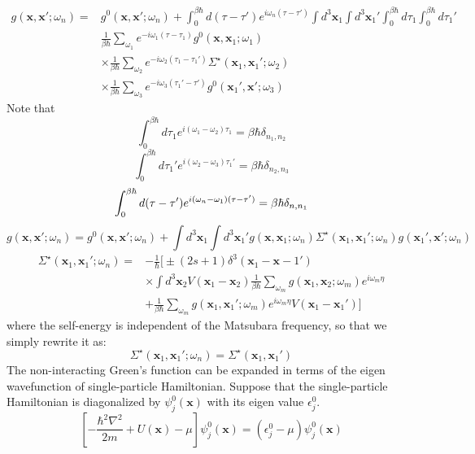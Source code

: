 \[
\begin{aligned}
g(\mathbf{x},\mathbf{x}';\omega_n)=&g^0(\mathbf{x},\mathbf{x}';\omega_n)+\int_0^{\beta\hbar} d(\tau-\tau') e^{i\omega_n(\tau-\tau')} \int d^3\mathbf{x}_1 \int d^3\mathbf{x}_1' \int_0^{\beta\hbar} d\tau_1 \int_0^{\beta\hbar} d\tau_1'\\
&\frac{1}{\beta\hbar}\sum_{\omega_1} e^{-i\omega_1(\tau-\tau_1)} g^0(\mathbf{x},\mathbf{x}_1;\omega_1)\\
&\times\frac{1}{\beta\hbar}\sum_{\omega_2} e^{-i\omega_2(\tau_1-\tau_1')} \Sigma^\star(\mathbf{x}_1,\mathbf{x}_1';\omega_2)\\
&\times\frac{1}{\beta\hbar}\sum_{\omega_3} e^{-i\omega_3(\tau_1'-\tau')} g^0(\mathbf{x}_1',\mathbf{x}';\omega_3)
\end{aligned}
\]
Note that
\[
\int_0^{\beta\hbar} d\tau_1 e^{i(\omega_1-\omega_2)\tau_1}=\beta\hbar\delta_{n_1,n_2}
\]
\[
\int_0^{\beta\hbar} d\tau_1' e^{i(\omega_2-\omega_3)\tau_1'}=\beta\hbar\delta_{n_2,n_3}
\]
\[
\int_0^{\beta\hbar} d(\tau-\tau') e^{i(\omega_n-\omega_1)(\tau-\tau')}=\beta\hbar\delta_{n,n_1}\\
\]
\[
g(\mathbf{x},\mathbf{x}';\omega_n)=g^0(\mathbf{x},\mathbf{x}';\omega_n)+\int d^3\mathbf{x}_1\int d^3\mathbf{x}_1' g(\mathbf{x},\mathbf{x}_1;\omega_n) \Sigma^\star(\mathbf{x}_1,\mathbf{x}_1';\omega_n) g(\mathbf{x}_1',\mathbf{x}';\omega_n)
\]
\begin{equation}\label{eq4.5.12}
\begin{aligned}
\Sigma^\star(\mathbf{x}_1,\mathbf{x}_1';\omega_n)=&-\frac{1}{\hbar}\Big [\pm(2s+1)\delta^3(\mathbf{x}_1-\mathbf{x}-1')\\
&\times\int d^3\mathbf{x}_2 V(\mathbf{x}_1-\mathbf{x}_2)\frac{1}{\beta\hbar} \sum_{\omega_m} g(\mathbf{x}_1,\mathbf{x}_2;\omega_m)e^{i\omega_m\eta}\\
&+\frac{1}{\beta\hbar}\sum_{\omega_m}g(\mathbf{x}_1,\mathbf{x}_1';\omega_m)e^{i\omega_m\eta}V(\mathbf{x}_1-\mathbf{x}_1')\Big ]
\end{aligned}
\end{equation}
where the self-energy is independent of the Matsubara frequency, so that we simply rewrite it as:
\[
\Sigma^\star(\mathbf{x}_1,\mathbf{x}_1';\omega_n)=\Sigma^\star(\mathbf{x}_1,\mathbf{x}_1')
\]
The non-interacting Green's function can be expanded in terms of the eigen wavefunction of single-particle Hamiltonian.
Suppose that the single-particle Hamiltonian is diagonalized by $\psi_j^0(\mathbf{x})$ with its eigen value $\epsilon_j^0$.
\begin{equation}
\left[-\frac{\hbar^2\nabla^2}{2m}+U(\mathbf{x})-\mu\right]\psi_j^0(\mathbf{x})=(\epsilon_j^0-\mu)\psi_j^0(\mathbf{x})
\end{equation}
